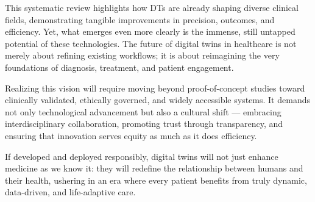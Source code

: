 \documentclass[10pt,a4paper]{article}
\begin{document}
This systematic review highlights how DTs are already shaping diverse clinical fields, demonstrating tangible improvements in precision, outcomes, and efficiency. Yet, what emerges even more clearly is the immense, still untapped potential of these technologies. The future of digital twins in healthcare is not merely about refining existing workflows; it is about reimagining the very foundations of diagnosis, treatment, and patient engagement.

Realizing this vision will require moving beyond proof-of-concept studies toward clinically validated, ethically governed, and widely accessible systems. It demands not only technological advancement but also a cultural shift — embracing interdisciplinary collaboration, promoting trust through transparency, and ensuring that innovation serves equity as much as it does efficiency.

If developed and deployed responsibly, digital twins will not just enhance medicine as we know it: they will redefine the relationship between humans and their health, ushering in an era where every patient benefits from truly dynamic, data-driven, and life-adaptive care.

\newpage
\begingroup
{}
\small %
\setlength{\bibsep}{4pt} %
\end{document}
